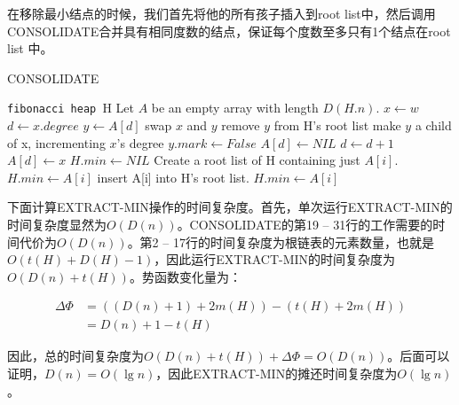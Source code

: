 \documentclass{ctexart}
\newcommand{\fibheap}{\texttt{fibonacci heap }}
\begin{document}
在移除最小结点的时候，我们首先将他的所有孩子插入到root list中，然后调用CONSOLIDATE合并具有相同度数的结点，保证每个度数至多只有1个结点在root list 中。

\begin{algorithm}[htp]
    \caption{CONSOLIDATE}
    \begin{algorithmic}[1]
        \Require \fibheap H
        \State Let $A$ be an empty array with length $D(H.n)$.
            \State $x \gets w$
            \State $d \gets x.degree$
             
                \State $y \gets A[d]$
                    \State swap $x$ and $y$
                \EndIf
                \State remove $y$ from H's root list
                \State make $y$ a child of x, incrementing $x$'s degree
                \State $y.mark \gets False$ 
                \State $A[d] \gets NIL$ 
                \State $d \gets d + 1$
            \EndWhile
            \State $A[d] \gets x$ 
        \EndFor
        \State $H.min \gets NIL$
                    \State Create a root list of H containing just $A[i]$.
                    \State $H.min \gets A[i]$
                \Else
                    \State insert A[i] into H's root list.
                        \State $H.min \gets A[i]$
                    \EndIf
                \EndIf
            \EndIf
        \EndFor
    \end{algorithmic}
\end{algorithm}
下面计算EXTRACT-MIN操作的时间复杂度。首先，单次运行EXTRACT-MIN的时间复杂度显然为$O(D(n))$。CONSOLIDATE的第19 -- 31行的工作需要的时间代价为$O(D(n))$。第2 -- 17行的时间复杂度为根链表的元素数量，也就是$O(t(H) + D(H) - 1)$，因此运行EXTRACT-MIN的时间复杂度为$O(D(n) + t(H))$。势函数变化量为：

\begin{align*}
    \Delta \Phi & = ((D(n) + 1 ) + 2m(H)) - (t(H) + 2m(H)) \\
                & = D(n) + 1 - t(H)
\end{align*}

因此，总的时间复杂度为$O(D(n) + t(H)) + \Delta \Phi = O(D(n))$。后面可以证明，$D(n) = O(\lg n)$，因此EXTRACT-MIN的摊还时间复杂度为$O(\lg n)$。
\end{document}

